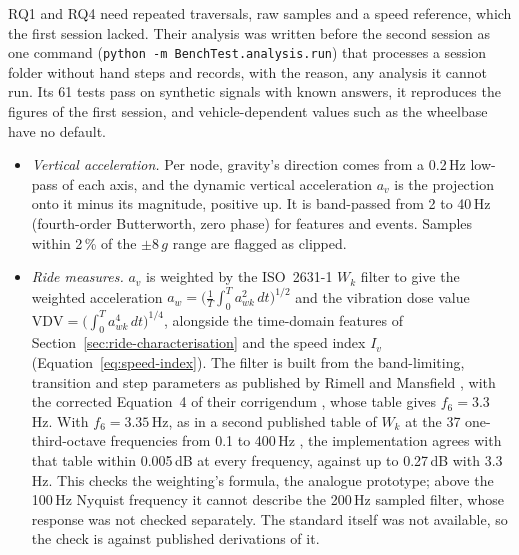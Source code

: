 RQ1 and RQ4 need repeated traversals, raw samples and a speed reference, which the first session lacked. Their analysis was written before the second session as one command (\texttt{python -m BenchTest.\allowbreak{}analysis.\allowbreak{}run}) that processes a session folder without hand steps and records, with the reason, any analysis it cannot run. Its 61 tests pass on synthetic signals with known answers, it reproduces the figures of the first session, and vehicle-dependent values such as the wheelbase have no default.

\begin{itemize}
\item \emph{Vertical acceleration.} Per node, gravity's direction comes from a 0.2\,Hz low-pass of each axis, and the dynamic vertical acceleration $a_v$ is the projection onto it minus its magnitude, positive up. It is band-passed from 2 to 40\,Hz (fourth-order Butterworth, zero phase) for features and events. Samples within 2\,\% of the $\pm 8\,g$ range are flagged as clipped.
\item \emph{Ride measures.} $a_v$ is weighted by the ISO~2631-1 $W_k$ filter \cite{iso2631} to give the weighted acceleration $a_w = \big(\frac{1}{T}\int_0^T a_{wk}^2\,dt\big)^{1/2}$ and the vibration dose value $\mathrm{VDV} = \big(\int_0^T a_{wk}^4\,dt\big)^{1/4}$, alongside the time-domain features of Section~\ref{sec:ride-characterisation} and the speed index $I_v$ (Equation~\ref{eq:speed-index}). The filter is built from the band-limiting, transition and step parameters as published by Rimell and Mansfield \cite{rimell2007}, with the corrected Equation~4 of their corrigendum \cite{rimell2010corr}, whose table gives $f_6 = 3.3$\,Hz. With $f_6 = 3.35$\,Hz, as in a second published table of $W_k$ at the 37 one-third-octave frequencies from 0.1 to 400\,Hz \cite{virtins2024}, the implementation agrees with that table within 0.005\,dB at every frequency, against up to 0.27\,dB with 3.3\,Hz. This checks the weighting's formula, the analogue prototype; above the 100\,Hz Nyquist frequency it cannot describe the 200\,Hz sampled filter, whose response was not checked separately. The standard itself was not available, so the check is against published derivations of it.

\end{itemize}
